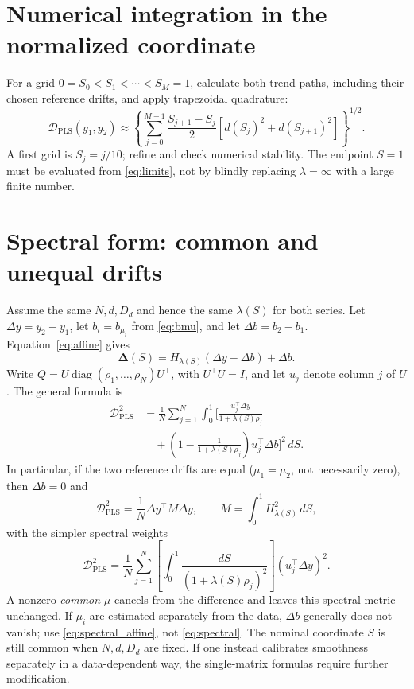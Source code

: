 \documentclass[10pt,letterpaper]{article}
\DeclareMathOperator{\diag}{diag}
\begin{document}
\section{Numerical integration in the normalized coordinate}
\label{sec:numerical}
For a grid $0=S_0<S_1<\cdots<S_M=1$, calculate both trend paths,
including their chosen reference drifts, and apply trapezoidal
quadrature:
\begin{equation}\label{eq:quad}
 \mathcal D_{\mathrm{PLS}}(y_1,y_2)
 \approx\left\{\sum_{j=0}^{M-1}\frac{S_{j+1}-S_j}{2}
 [d(S_j)^2+d(S_{j+1})^2]\right\}^{1/2}.
\end{equation}
A first grid is $S_j=j/10$; refine and check numerical stability.
The endpoint $S=1$ must be evaluated from \eqref{eq:limits}, not by
blindly replacing $\lambda=\infty$ with a large finite number.

\section{Spectral form: common and unequal drifts}
\label{sec:spectral}
Assume the same $N,d,D_d$ and hence the same $\lambda(S)$ for both
series. Let $\Delta y=y_2-y_1$, let
$b_i=b_{\mu_i}$ from \eqref{eq:bmu}, and let $\Delta b=b_2-b_1$.
Equation~\eqref{eq:affine} gives
\begin{equation}\label{eq:spectral_difference}
 \bm\Delta(S)
 =H_{\lambda(S)}(\Delta y-\Delta b)+\Delta b.
\end{equation}
Write $Q=U\diag(\rho_1,\ldots,\rho_N)U^\top$, with $U^\top U=I$,
and let $u_j$ denote column $j$ of $U$. The general formula is
\begin{equation}\label{eq:spectral_affine}
\begin{aligned}
\mathcal D_{\mathrm{PLS}}^2
 &=\frac1N\sum_{j=1}^N\int_0^1\Biggl[
 \frac{u_j^\top\Delta y}{1+\lambda(S)\rho_j}\\
 &\quad+\left(1-\frac1{1+\lambda(S)\rho_j}\right)
 u_j^\top\Delta b\Biggr]^2\,dS.
\end{aligned}
\end{equation}
In particular, if the two reference drifts are equal
($\mu_1=\mu_2$, not necessarily zero), then $\Delta b=0$ and
\begin{equation}\label{eq:M}
 \mathcal D_{\mathrm{PLS}}^2=\frac1N\Delta y^\top M\Delta y,
 \qquad M=\int_0^1H_{\lambda(S)}^2\,dS,
\end{equation}
with the simpler spectral weights
\begin{equation}\label{eq:spectral}
 \mathcal D_{\mathrm{PLS}}^2
 =\frac1N\sum_{j=1}^N\left[\int_0^1
 \frac{dS}{(1+\lambda(S)\rho_j)^2}\right]
 (u_j^\top\Delta y)^2.
\end{equation}
A nonzero \emph{common} $\mu$ cancels from the difference and leaves
this spectral metric unchanged. If $\mu_i$ are estimated separately
from the data, $\Delta b$ generally does not vanish; use
\eqref{eq:spectral_affine}, not \eqref{eq:spectral}. The nominal
coordinate $S$ is still common when $N,d,D_d$ are fixed. If one
instead calibrates smoothness separately in a data-dependent way, the
single-matrix formulas require further modification.
\end{document}

